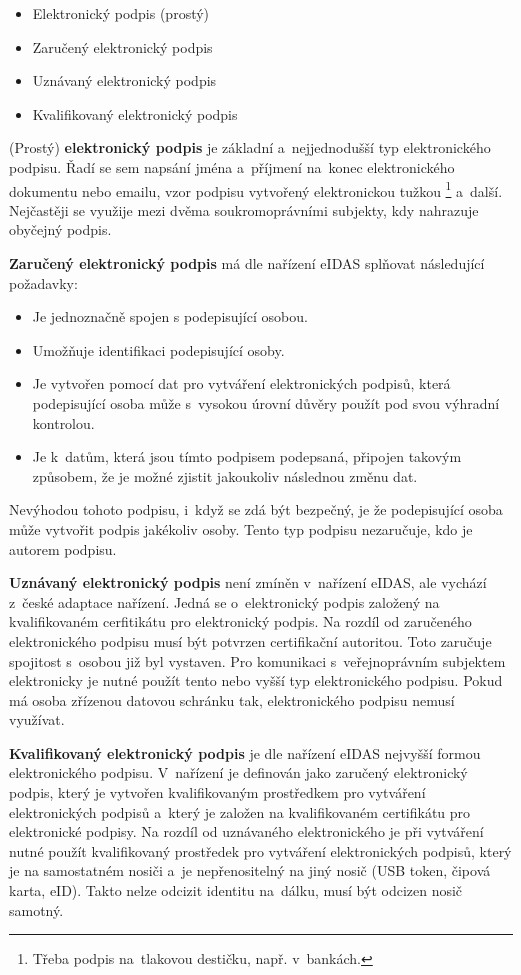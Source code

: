 \begin{itemize}
    \item Elektronický podpis (prostý)
    \item Zaručený elektronický podpis
    \item Uznávaný elektronický podpis
    \item Kvalifikovaný elektronický podpis
\end{itemize}

(Prostý) \textbf{elektronický podpis} je základní a~nejjednodušší typ elektronického podpisu. Řadí se sem napsání jména a~příjmení na~konec elektronického dokumentu nebo emailu, vzor podpisu vytvořený elektronickou tužkou%
\footnote{Třeba podpis na~tlakovou destičku, např. v~bankách.} %
a~další. Nejčastěji se využije mezi dvěma soukromoprávními subjekty, kdy nahrazuje obyčejný podpis.

\textbf{Zaručený elektronický podpis} má dle nařízení eIDAS splňovat následující požadavky:

\begin{itemize}
    \item Je jednoznačně spojen s podepisující osobou.
    \item Umožňuje identifikaci podepisující osoby.
    \item Je vytvořen pomocí dat pro vytváření elektronických podpisů, která podepisující osoba může s~vysokou úrovní důvěry použít pod svou výhradní kontrolou.
    \item Je k~datům, která jsou tímto podpisem podepsaná, připojen takovým způsobem, že je možné zjistit jakoukoliv následnou změnu dat.
\end{itemize}

Nevýhodou tohoto podpisu, i~když se zdá být bezpečný, je že podepisující osoba může vytvořit podpis jakékoliv osoby. Tento typ podpisu nezaručuje, kdo je autorem podpisu.

\textbf{Uznávaný elektronický podpis} není zmíněn v~nařízení eIDAS, ale vychází z~české adaptace nařízení. Jedná se o~elektronický podpis založený na kvalifikovaném cerfitikátu pro elektronický podpis. Na rozdíl od zaručeného elektronického podpisu musí být potvrzen certifikační autoritou. Toto zaručuje spojitost s~osobou již byl vystaven. Pro komunikaci s~veřejnoprávním subjektem elektronicky je nutné použít tento nebo vyšší typ elektronického podpisu. Pokud má osoba zřízenou datovou schránku tak, elektronického podpisu nemusí využívat.

\textbf{Kvalifikovaný elektronický podpis} je dle nařízení eIDAS nejvyšší formou elektronického podpisu. V~nařízení je definován jako zaručený elektronický podpis, který je vytvořen kvalifikovaným prostředkem pro vytváření elektronických podpisů a~který je založen na kvalifikovaném certifikátu pro elektronické podpisy. Na rozdíl od uznávaného elektronického je při vytváření nutné použít kvalifikovaný prostředek pro vytváření elektronických podpisů, který je na samostatném nosiči a~je nepřenositelný na jiný nosič (USB token, čipová karta, eID). Takto nelze odcizit identitu na~dálku, musí být odcizen nosič samotný.

